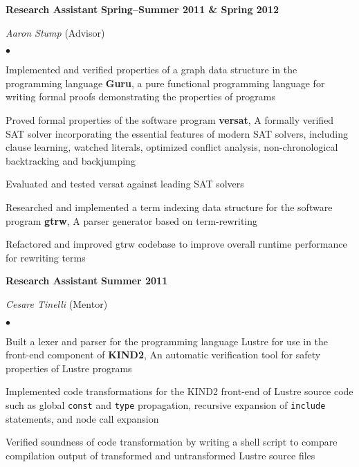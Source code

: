 \documentclass[10pt,letterpaper]{article}
\renewenvironment{itemize}{
  \begin{list}{}{
      \setlength{\leftmargin}{1.5em}
      \setlength{\itemsep}{0.25em}
      \setlength{\parskip}{0pt}
      \setlength{\parsep}{0.25em}
    }
  }{
  \end{list}
}
\newenvironment{bitemize}{
  \begin{list}{\(\bullet \)}{
      \setlength{\leftmargin}{1.5em}
      \setlength{\itemsep}{0.25em}
      \setlength{\parskip}{0pt}
      \setlength{\parsep}{0.25em}
    }
  }{
  \end{list}
}
\newcommand{\yearrange}[1]{\hfill \textbf{#1} \par}
\begin{document}
\begin{itemize}
\item \textbf{Research Assistant} \yearrange{Spring--Summer 2011
    \& Spring 2012}
  \textit{Aaron Stump} (Advisor)
  \begin{bitemize}
  \item Implemented and verified properties of a graph data structure in the
    programming language \textbf{Guru}, a pure functional programming language
    for writing formal proofs demonstrating the properties of programs
  \item Proved formal properties of the software program \textbf{versat}, A
    formally verified SAT solver incorporating the essential features of modern
    SAT solvers, including clause learning, watched literals, optimized conflict
    analysis, non-chronological backtracking and backjumping
  \item Evaluated and tested versat against leading SAT solvers
  \item Researched and implemented a term indexing data structure for the
    software program \textbf{gtrw}, A parser generator based on term-rewriting
  \item Refactored and improved gtrw codebase to improve overall runtime
    performance for rewriting terms
  \end{bitemize}
\item \textbf{Research Assistant} \yearrange{Summer 2011} \textit{Cesare
  Tinelli} (Mentor)
  \begin{bitemize}
  \item Built a lexer and parser for the programming language Lustre for use in
    the front-end component of \textbf{KIND2}, An automatic verification tool
    for safety properties of Lustre programs
  \item Implemented code transformations for the KIND2 front-end of Lustre
    source code such as global \texttt{const} and \texttt{type} propagation,
    recursive expansion of \texttt{include} statements, and node call expansion
  \item Verified soundness of code transformation by writing a shell script to
    compare compilation output of transformed and untransformed Lustre source
    files
  \end{bitemize}
\end{itemize}
\end{document}

